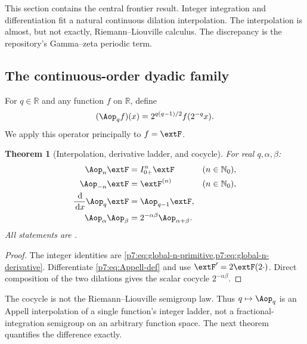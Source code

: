 \documentclass[11pt,oneside]{article}
\newtheorem{theorem}{Theorem}[section]
\theoremstyle{definition}
\theoremstyle{remark}
\newcommand{\R}{\mathbb R}
\newcommand{\N}{\mathbb N}
\newcommand{\dd}{\,\mathrm d}
\newcommand{\1}{\mathbf 1}
\begin{document}
This section contains the central frontier result.  Integer integration and differentiation
fit a natural continuous dilation interpolation.  The interpolation is almost, but not
exactly, Riemann--Liouville calculus.  The discrepancy is the repository's Gamma--zeta
periodic term.

\subsection{The continuous-order dyadic family}

\begin{definition}
For $q\in\R$ and any function $f$ on $\R$, define
\begin{equation}
 (\Aop_q f)(x)=2^{q(q-1)/2}f(2^{-q}x).
 \label{p7:eq:Appell-def}
\end{equation}
We apply this operator principally to $f=\extF$.
\end{definition}

\begin{theorem}[Interpolation, derivative ladder, and cocycle]
\label{p7:thm:Appell-structure}
For real $q,\alpha,\beta$:
\begin{align}
 \Aop_n\extF&=I_{0+}^{n}\extF &&(n\in\N_0),
 \label{p7:eq:Appell-positive-integers}\\
 \Aop_{-n}\extF&=\extF^{(n)} &&(n\in\N_0),
 \label{p7:eq:Appell-negative-integers}\\
 \frac{\dd}{\dd x}\Aop_q\extF&=\Aop_{q-1}\extF,
 \label{p7:eq:Appell-derivative}\\
 \Aop_\alpha\Aop_\beta&=2^{-\alpha\beta}\Aop_{\alpha+\beta}.
 \label{p7:eq:Appell-cocycle}
\end{align}
All statements are \statusproved.
\end{theorem}

\begin{proof}
The integer identities are \cref{p7:eq:global-n-primitive,p7:eq:global-n-derivative}.  Differentiate
\cref{p7:eq:Appell-def} and use $\extF'=2\extF(2\cdot)$.  Direct composition of the two dilations
gives the scalar cocycle $2^{-\alpha\beta}$.
\end{proof}

\begin{remark}
The cocycle is not the Riemann--Liouville semigroup law.  Thus $q\mapsto\Aop_q$ is an Appell
interpolation of a single function's integer ladder, not a fractional-integration semigroup on
an arbitrary function space.  The next theorem quantifies the difference exactly.
\end{remark}
\end{document}

